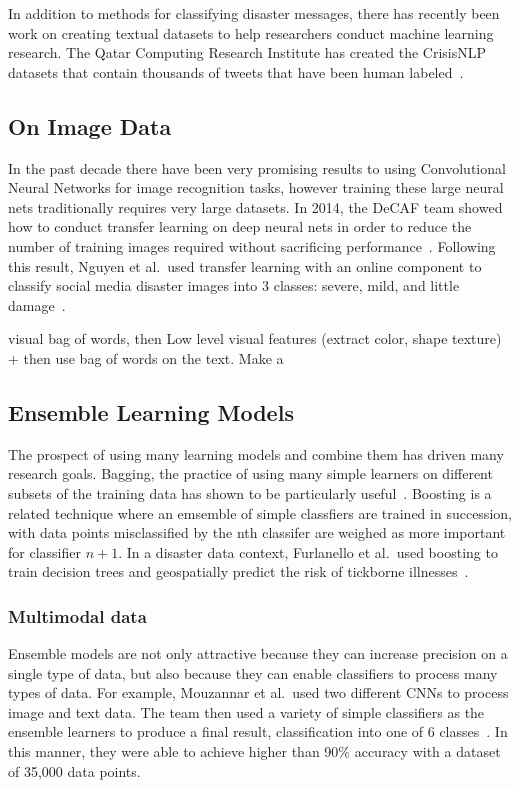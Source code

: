 In addition to methods for classifying disaster messages, there has recently been work 
on creating textual datasets to help researchers conduct machine learning research. 
The Qatar Computing Research Institute has created the CrisisNLP datasets that 
contain thousands of tweets that have been human labeled~\cite{nguyenRapidClassificationCrisisRelated}.

\subsection{On Image Data}\label{chap3:image}
In the past decade there have been very promising results to using Convolutional Neural Networks
for image recognition tasks, however training these large neural nets traditionally
requires very large datasets. In 2014, the DeCAF team showed how to conduct 
transfer learning on deep neural nets in order to reduce the number of 
training images required without sacrificing performance~\cite{donahueDeCAFDeepConvolutional2013}.
Following this result, Nguyen et al.\ used transfer learning with an online component 
to classify social media disaster images into 3 classes: severe, mild, and little
damage~\cite{nguyenDamageAssessmentSocial2017}. 

  visual bag of words, then Low level visual features (extract color, shape
  texture) + then use bag of words on the text. Make
  a~\cite{jomaaSemanticVisualCues2016}

\subsection{Ensemble Learning Models}
  The prospect of using many learning models and combine them has driven many 
  research goals. Bagging, the practice of using many simple learners on
  different subsets of the training data has shown to be particularly
  useful~\cite{breimanBaggingPredictors1996}.  Boosting is a related technique
  where an emsemble of simple classfiers are trained in succession, with
  data points misclassified by the nth classifer are weighed as more important
  for classifier $n+1$. In a disaster data context, Furlanello et al.\ used
  boosting to train decision trees and geospatially predict the risk of
  tickborne illnesses~\cite{furlanelloBoostingTreeBasedClassifiers2000}.
  
  
  \subsubsection{Multimodal data} 
  Ensemble models are not only attractive because they can increase precision on a
  single type of data, but also because they can enable classifiers to process
  many types of data. For example, Mouzannar et al.\ used two different CNNs to 
  process image and text data. The team then used a variety of simple classifiers 
  as the ensemble learners to produce a final result,
  classification into one of 6 classes~\cite{mouzannarDamageIdentificationSocial2018}.
  In this manner, they were able to achieve higher than 90\% accuracy with a dataset of 
  35,000 data points.

